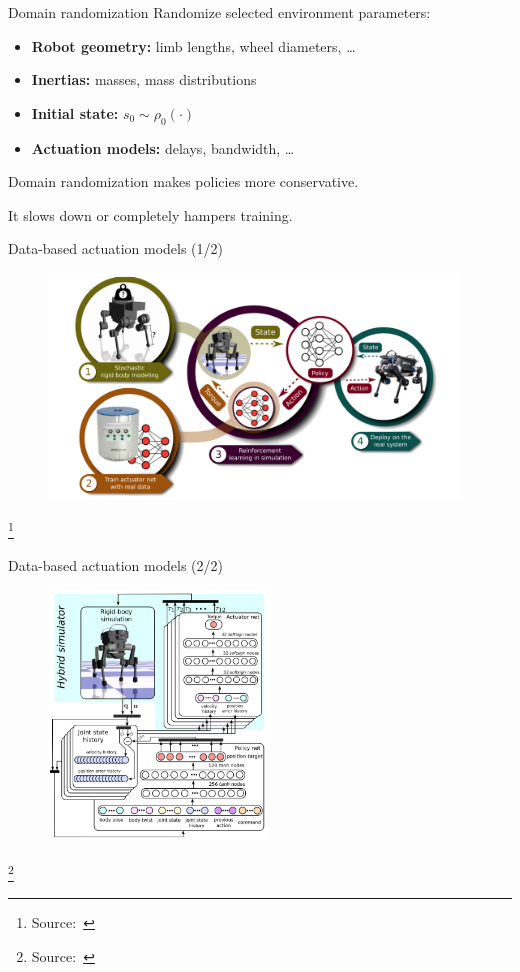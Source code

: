 \documentclass[10pt, aspectratio=1610]{beamer}
\newcommand\blfootnote[1]{%
  \begingroup
  \renewcommand\thefootnote{}%
  \footnote{#1}%
  \addtocounter{footnote}{-1}%
  \endgroup
}
\begin{document}
\begin{frame}{Domain randomization}
    Randomize selected environment parameters:
    \begin{itemize}
        \item \textbf{Robot geometry:} limb lengths, wheel diameters, \ldots
        \item \textbf{Inertias:} masses, mass distributions
        \item \textbf{Initial state:} $s_0 \sim \rho_0(\cdot)$
        \item \textbf{Actuation models:} delays, bandwidth, \ldots
    \end{itemize}
    Domain randomization makes policies more conservative.

    It slows down or completely hampers training.
\end{frame}

\begin{frame}{Data-based actuation models (1/2)}
    \begin{figure}
        \includegraphics[height=6cm]{figures/quadruped-sim-pipeline.png}
    \end{figure}
    \blfootnote{
        Source:~\cite{hwangbo2019}
    }
\end{frame}

\begin{frame}{Data-based actuation models (2/2)}
    \begin{figure}
        \includegraphics[height=6.7cm]{figures/quadruped-training.png}
    \end{figure}
    \vspace{-0.7cm}
    \blfootnote{
        Source:~\cite{hwangbo2019}
    }
\end{frame}
\end{document}
